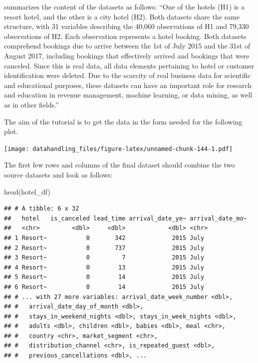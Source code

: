 \documentclass[
  12pt,
]{style/krantz}
\newenvironment{Shaded}{\begin{snugshade}}{\end{snugshade}}
\newcommand{\FunctionTok}[1]{\textcolor[rgb]{0.00,0.00,0.00}{#1}}
\newcommand{\NormalTok}[1]{#1}
\begin{document}
\citet{nuno_etal2019} summarizes the content of the datasets as follows: ``One of the hotels (H1) is a resort hotel, and the other is a city hotel (H2). Both datasets share the same structure, with 31 variables describing the 40,060 observations of H1 and 79,330 observations of H2. Each observation represents a hotel booking. Both datasets comprehend bookings due to arrive between the 1st of July 2015 and the 31st of August 2017, including bookings that effectively arrived and bookings that were canceled. Since this is real data, all data elements pertaining to hotel or customer identification were deleted. Due to the scarcity of real business data for scientific and educational purposes, these datasets can have an important role for research and education in revenue management, machine learning, or data mining, as well as in other fields.''

The aim of the tutorial is to get the data in the form needed for the following plot.

\texttt{[image: datahandling\_files/figure-latex/unnamed-chunk-144-1.pdf]}

The first few rows and columns of the final dataset should combine the two source datasets and look as follows:

\begin{Shaded}
\begin{Highlighting}[]
\FunctionTok{head}\NormalTok{(hotel\_df)}
\end{Highlighting}
\end{Shaded}

\begin{verbatim}
## # A tibble: 6 x 32
##   hotel   is_canceled lead_time arrival_date_ye~ arrival_date_mo~
##   <chr>         <dbl>     <dbl>            <dbl> <chr>           
## 1 Resort~           0       342             2015 July            
## 2 Resort~           0       737             2015 July            
## 3 Resort~           0         7             2015 July            
## 4 Resort~           0        13             2015 July            
## 5 Resort~           0        14             2015 July            
## 6 Resort~           0        14             2015 July            
## # ... with 27 more variables: arrival_date_week_number <dbl>,
## #   arrival_date_day_of_month <dbl>,
## #   stays_in_weekend_nights <dbl>, stays_in_week_nights <dbl>,
## #   adults <dbl>, children <dbl>, babies <dbl>, meal <chr>,
## #   country <chr>, market_segment <chr>,
## #   distribution_channel <chr>, is_repeated_guest <dbl>,
## #   previous_cancellations <dbl>, ...
\end{verbatim}
\end{document}
